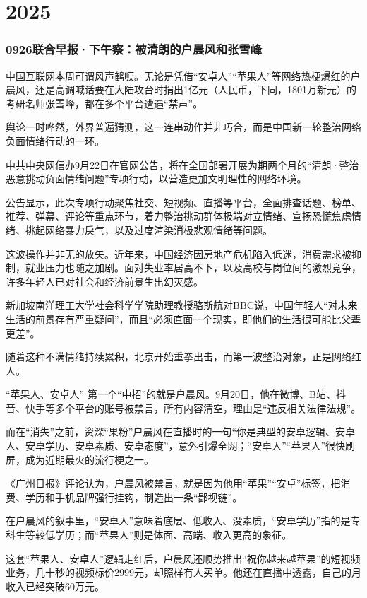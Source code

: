 \part{2025}
\section{
    0926联合早报·下午察：被清朗的户晨风和张雪峰
} {
    \setlength{\parindent}{2em}
    中国互联网本周可谓风声鹤唳。无论是凭借“安卓人”“苹果人”等网络热梗爆红的户晨风，还是高调喊话要在大陆攻台时捐出1亿元（人民币，下同，1801万新元）的考研名师张雪峰，都在多个平台遭遇“禁声”。

    舆论一时哗然，外界普遍猜测，这一连串动作并非巧合，而是中国新一轮整治网络负面情绪行动的一环。

中共中央网信办9月22日在官网公告，将在全国部署开展为期两个月的“清朗·整治恶意挑动负面情绪问题”专项行动，以营造更加文明理性的网络环境。

公告显示，此次专项行动聚焦社交、短视频、直播等平台，全面排查话题、榜单、推荐、弹幕、评论等重点环节，着力整治挑动群体极端对立情绪、宣扬恐慌焦虑情绪、挑起网络暴力戾气，以及过度渲染消极悲观情绪等问题。

这波操作并非无的放矢。近年来，中国经济因房地产危机陷入低迷，消费需求被抑制，就业压力也随之加剧。面对失业率居高不下，以及高校与岗位间的激烈竞争，许多年轻人已对社会和经济前景生出幻灭感。

新加坡南洋理工大学社会科学学院助理教授骆斯航对BBC说，中国年轻人“对未来生活的前景存有严重疑问”，而且“必须直面一个现实，即他们的生活很可能比父辈更差”。

随着这种不满情绪持续累积，北京开始重拳出击，而第一波整治对象，正是网络红人。

“苹果人、安卓人”
第一个“中招”的就是户晨风。9月20日，他在微博、B站、抖音、快手等多个平台的账号被禁言，所有内容清空，理由是“违反相关法律法规”。

而在“消失”之前，资深“果粉”户晨风在直播时的一句“你是典型的安卓逻辑、安卓人、安卓学历、安卓素质、安卓态度”，意外引爆全网；“安卓人”“苹果人”很快刷屏，成为近期最火的流行梗之一。

《广州日报》评论认为，户晨风被禁言，就是因为他用“苹果”“安卓”标签，把消费、学历和手机品牌强行挂钩，制造出一条“鄙视链”。

在户晨风的叙事里，“安卓人”意味着底层、低收入、没素质，“安卓学历”指的是专科生等较低学历；而“苹果人”则是体面、高端、收入更高的象征。

这套“苹果人、安卓人”逻辑走红后，户晨风还顺势推出“祝你越来越苹果”的短视频业务，几十秒的视频标价2999元，却照样有人买单。他还在直播中透露，自己的月收入已经突破60万元。

}

